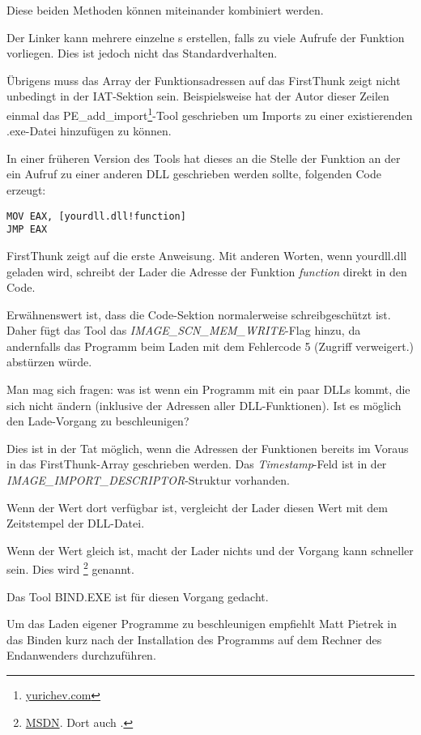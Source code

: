 Diese beiden Methoden können miteinander kombiniert werden.

Der Linker kann mehrere einzelne s erstellen, falls zu viele Aufrufe der
Funktion vorliegen. Dies ist jedoch nicht das Standardverhalten.

Übrigens muss das Array der Funktionsadressen auf das FirstThunk zeigt nicht unbedingt
in der \ac{IAT}-Sektion sein. Beispielsweise hat der Autor dieser Zeilen einmal das
PE\_add\_import\footnote{\href{http://go.yurichev.com/17049}{yurichev.com}}-Tool
geschrieben um Imports zu einer existierenden .exe-Datei hinzufügen zu können.

In einer früheren Version des Tools hat dieses an die Stelle der Funktion an der
ein Aufruf zu einer anderen DLL geschrieben werden sollte, folgenden Code erzeugt:

\begin{lstlisting}
MOV EAX, [yourdll.dll!function]
JMP EAX
\end{lstlisting}

FirstThunk zeigt auf die erste Anweisung. Mit anderen Worten, wenn yourdll.dll
geladen wird, schreibt der Lader die Adresse der Funktion \emph{function} direkt
in den Code.

Erwähnenswert ist, dass die Code-Sektion normalerweise schreibgeschützt ist.
Daher fügt das Tool das \emph{IMAGE\_SCN\_MEM\_WRITE}-Flag hinzu, da andernfalls
das Programm beim Laden mit dem Fehlercode 5 (Zugriff verweigert.) abstürzen
würde.

Man mag sich fragen: was ist wenn ein Programm mit ein paar DLLs kommt, die
sich nicht ändern (inklusive der Adressen aller DLL-Funktionen). Ist es möglich
den Lade-Vorgang zu beschleunigen?

Dies ist in der Tat möglich, wenn die Adressen der Funktionen bereits im Voraus
in das FirstThunk-Array geschrieben werden. Das \emph{Timestamp}-Feld ist in der
\emph{IMAGE\_IMPORT\_DESCRIPTOR}-Struktur vorhanden.

Wenn der Wert dort verfügbar ist, vergleicht der Lader diesen Wert mit dem
Zeitstempel der DLL-Datei.

Wenn der Wert gleich ist, macht der Lader nichts und der Vorgang kann schneller
sein. Dies wird \footnote{\href{http://go.yurichev.com/17050}{MSDN}. Dort auch .}
genannt.

Das Tool BIND.EXE ist für diesen Vorgang gedacht.

Um das Laden eigener Programme zu beschleunigen empfiehlt Matt Pietrek in \PietrekPEURL
das Binden kurz nach der Installation des Programms auf dem Rechner des Endanwenders
durchzuführen.

